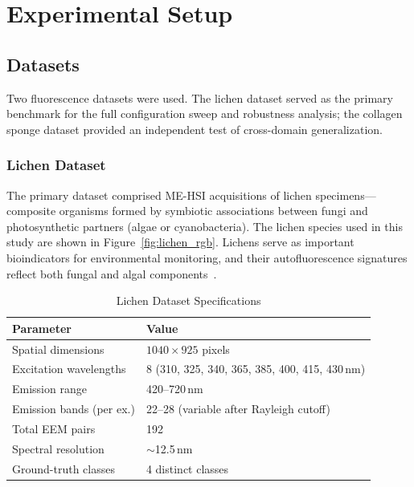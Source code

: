 \section{Experimental Setup}
\label{sec:experimental_setup}

\subsection{Datasets}
\label{sec:datasets}

Two fluorescence datasets were used. The lichen dataset served as the primary benchmark for the full configuration sweep and robustness analysis; the collagen sponge dataset provided an independent test of cross-domain generalization.

\subsubsection{Lichen Dataset}
\label{sec:dataset_lichen}

The primary dataset comprised ME-HSI acquisitions of lichen specimens---composite organisms formed by symbiotic associations between fungi and photosynthetic partners (algae or cyanobacteria).
The lichen species used in this study are shown in Figure~\ref{fig:lichen_rgb}.
Lichens serve as important bioindicators for environmental monitoring, and their autofluorescence signatures reflect both fungal and algal components~\cite{meysurova2021optical}.

\begin{table}[!t]
\centering
\caption{Lichen Dataset Specifications}
\label{tab:dataset}
\begin{tabular}{@{}ll@{}}
\toprule
\textbf{Parameter} & \textbf{Value} \\
\midrule
Spatial dimensions & $1040 \times 925$ pixels \\
Excitation wavelengths & 8 (310, 325, 340, 365, 385, 400, 415, 430\,nm) \\
Emission range & 420--720\,nm \\
Emission bands (per ex.) & 22--28 (variable after Rayleigh cutoff) \\
Total EEM pairs & 192 \\
Spectral resolution & $\sim$12.5\,nm \\
Ground-truth classes & 4 distinct classes \\
\bottomrule
\end{tabular}
\end{table}

